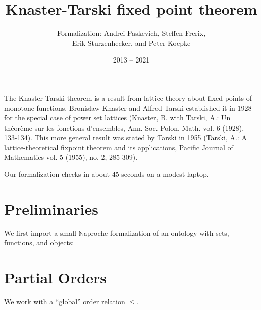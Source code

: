 \documentclass{article}
\title{Knaster-Tarski fixed point theorem}
\author{\Naproche{} Formalization: Andrei Paskevich, Steffen Frerix,\\
Erik Sturzenhecker, and Peter Koepke}
\date{2013 -- 2021}
\begin{document}

  \maketitle

  The Knaster-Tarski theorem is a result from lattice theory about fixed points
  of monotone functions.
  Bronis\l aw Knaster and Alfred Tarski established it in 1928 for the special
  case of power set lattices (Knaster, B. with Tarski, A.: Un th\' eor\`eme sur
  les fonctions d'ensembles, Ann. Soc. Polon. Math. vol. 6 (1928), 133-134).
  This more general result was stated by Tarski in 1955 (Tarski, A.: A
  lattice-theoretical fixpoint theorem and its applications, Pacific Journal of
  Mathematics vol. 5 (1955), no. 2, 285-309).

  Our formalization checks in about 45 seconds on a modest laptop.

  \section{Preliminaries}
  We first import a small $\mathbb{N}$aproche formalization of an ontology with
  sets, functions, and objects:

  \begin{forthel}
  \end{forthel}

  \section{Partial Orders}
  We work with a ``global'' order relation $\leq$.
\end{document}
